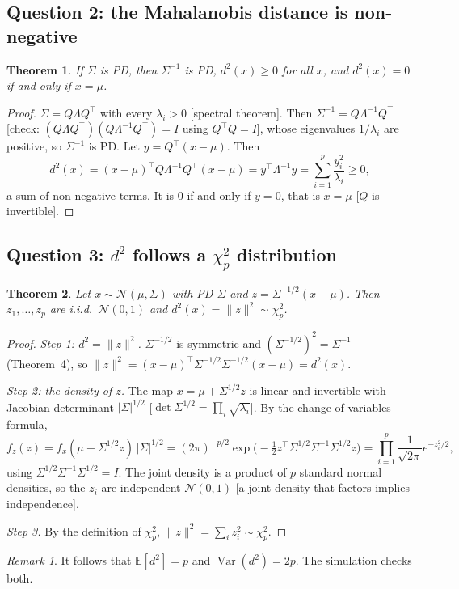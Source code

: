 \documentclass[11pt]{article}
\newcommand{\E}{\mathbb{E}}
\newcommand{\Var}{\operatorname{Var}}
\newcommand{\T}{^{\top}}
\newcommand{\norm}[1]{\lVert #1\rVert}
\theoremstyle{plain}
\newtheorem{theorem}{Theorem}
\theoremstyle{definition}
\theoremstyle{remark}
\newtheorem*{remark}{Remark}
\begin{document}
\subsection{Question 2: the Mahalanobis distance is non-negative}
\begin{theorem}\label{thm:nonneg}
If $\Sigma$ is PD, then $\Sigma^{-1}$ is PD, $d^2(x)\ge0$ for all $x$, and
$d^2(x)=0$ if and only if $x=\mu$.
\end{theorem}
\begin{proof}
$\Sigma=Q\Lambda Q\T$ with every $\lambda_i>0$ [spectral theorem]. Then
$\Sigma^{-1}=Q\Lambda^{-1}Q\T$ [check: $(Q\Lambda Q\T)(Q\Lambda^{-1}Q\T)=I$ using
$Q\T Q=I$], whose eigenvalues $1/\lambda_i$ are positive, so $\Sigma^{-1}$ is PD. Let
$y=Q\T(x-\mu)$. Then
\[
d^2(x)=(x-\mu)\T Q\Lambda^{-1}Q\T(x-\mu)=y\T\Lambda^{-1}y=\sum_{i=1}^p\frac{y_i^2}{\lambda_i}\ge 0,
\]
a sum of non-negative terms. It is $0$ if and only if $y=0$, that is $x=\mu$
[$Q$ is invertible].
\end{proof}

\subsection{Question 3: $d^2$ follows a $\chi^2_p$ distribution}
\begin{theorem}\label{thm:chi2}
Let $x\sim\mathcal N(\mu,\Sigma)$ with PD $\Sigma$ and $z=\Sigma^{-1/2}(x-\mu)$. Then
$z_1,\dots,z_p$ are i.i.d.\ $\mathcal N(0,1)$ and $d^2(x)=\norm z^2\sim\chi^2_p$.
\end{theorem}
\begin{proof}
\textit{Step 1: $d^2=\norm z^2$.} $\Sigma^{-1/2}$ is symmetric and
$(\Sigma^{-1/2})^2=\Sigma^{-1}$ (Theorem~4), so
$\norm z^2=(x-\mu)\T\Sigma^{-1/2}\Sigma^{-1/2}(x-\mu)=d^2(x)$.

\textit{Step 2: the density of $z$.} The map $x=\mu+\Sigma^{1/2}z$ is linear and
invertible with Jacobian determinant $|\Sigma|^{1/2}$
[$\det\Sigma^{1/2}=\prod_i\sqrt{\lambda_i}$]. By the change-of-variables formula,
\[
f_z(z)=f_x(\mu+\Sigma^{1/2}z)\,|\Sigma|^{1/2}
=(2\pi)^{-p/2}\exp\!\Big(-\tfrac12z\T\Sigma^{1/2}\Sigma^{-1}\Sigma^{1/2}z\Big)
=\prod_{i=1}^p\frac{1}{\sqrt{2\pi}}e^{-z_i^2/2},
\]
using $\Sigma^{1/2}\Sigma^{-1}\Sigma^{1/2}=I$. The joint density is a product of $p$
standard normal densities, so the $z_i$ are independent $\mathcal N(0,1)$
[a joint density that factors implies independence].

\textit{Step 3.} By the definition of $\chi^2_p$, $\norm z^2=\sum_iz_i^2\sim\chi^2_p$.
\end{proof}
\begin{remark}
It follows that $\E[d^2]=p$ and $\Var(d^2)=2p$. The simulation checks both.
\end{remark}
\end{document}
